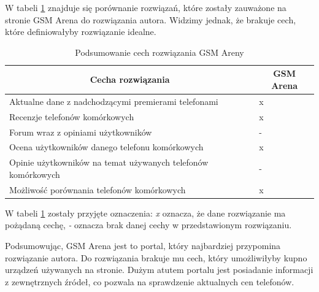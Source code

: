 W tabeli \ref*{comparison_gsm_arena} znajduje się porównanie rozwiązań, które zostały zauważone na stronie GSM Arena do rozwiązania autora. Widzimy jednak, że brakuje cech, które definiowałyby rozwiązanie idealne.
\begin{table}[H]
    \centering
    \begin{tabular}{|l|l|}
        \hline
        \multicolumn{1}{|c|}{Cecha rozwiązania} & \multicolumn{1}{c|}{GSM Arena} \\ \hline
        Aktualne dane z nadchodzącymi premierami telefonami & x \\ \hline
        Recenzje telefonów komórkowych & x \\ \hline
        Forum wraz z opiniami użytkowników & - \\ \hline
        Ocena użytkowników danego telefonu komórkowych & x \\ \hline
        Opinie użytkowników na temat używanych telefonów komórkowych & - \\ \hline
        Możliwość porównania telefonów komórkowych & x \\ \hline
    \end{tabular}
    \caption{Podsumowanie cech rozwiązania GSM Areny}
    \label{comparison_gsm_arena}
\end{table}
W tabeli \ref*{comparison_gsm_arena} zostały przyjęte oznaczenia: \textit{x} oznacza, że dane rozwiązanie ma pożądaną cechę, \textit{-} oznacza brak danej cechy w przedstawionym rozwiązaniu.

Podsumowując, GSM Arena jest to portal, który najbardziej przypomina rozwiązanie autora. Do rozwiązania brakuje mu cech, który umożliwiłyby kupno urządzeń używanych na stronie. Dużym atutem portalu jest posiadanie informacji z zewnętrznych źródeł, co pozwala na sprawdzenie aktualnych cen telefonów. 

\newpage
